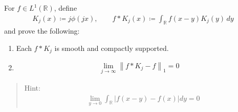 For \(f\in L^1({\mathbb{R}})\), define
\begin{align*}
K_{j}(x) \coloneqq j \phi(j x), 
\qquad 
f \ast K_{j}(x) \coloneqq\int_{{\mathbb{R}}} f(x-y) K_{j}(y) \, dy
\end{align*}
and prove the following:

\begin{enumerate}
\def\labelenumi{\arabic{enumi}.}
\item
  Each \(f\ast K_j\) is smooth and compactly supported.
\item

  \begin{align*}
  \lim _{j \to \infty} {\left\lVert {f * K_{j}-f} \right\rVert}_{1} = 0
  \end{align*}
\end{enumerate}

\begin{quote}
Hint:
\begin{align*}
\lim _{y \to 0} \int _{{\mathbb{R}}} |f(x-y)-f(x)| dy = 0
\end{align*}
\end{quote}


